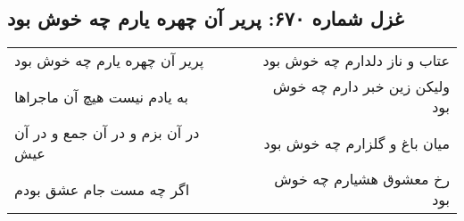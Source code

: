 \begin{center}
\section*{غزل شماره ۶۷۰: پریر آن چهره یارم چه خوش بود}
\label{sec:0670}
\begin{longtable}{l p{0.5cm} r}
پریر آن چهره یارم چه خوش بود
&&
عتاب و ناز دلدارم چه خوش بود
\\
به یادم نیست هیچ آن ماجراها
&&
ولیکن زین خبر دارم چه خوش بود
\\
در آن بزم و در آن جمع و در آن عیش
&&
میان باغ و گلزارم چه خوش بود
\\
اگر چه مست جام عشق بودم
&&
رخ معشوق هشیارم چه خوش بود
\\
\end{longtable}
\end{center}

